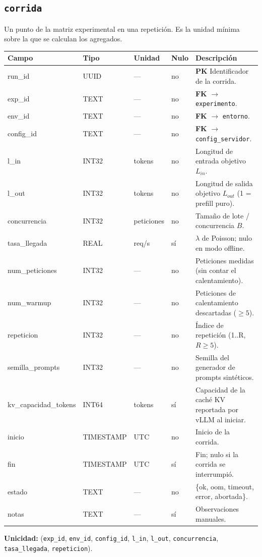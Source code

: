 \documentclass[11pt,a4paper]{article}
\makeatletter
\newcommand{\PK}{\textcolor{pkc}{\textbf{PK}}}
\newcommand{\FK}{\textcolor{fkc}{\textbf{FK}}}
\newcommand{\campo}[1]{\texttt{#1}}
\newenvironment{diccionario}{%
  \small
  \begin{longtable}{@{}>{\raggedright\ttfamily}p{3.4cm}>{\raggedright}p{2.2cm}>{\raggedright}p{1.6cm}p{0.9cm}>{\raggedright\arraybackslash}p{5.8cm}@{}}
  \toprule
  \normalfont\textbf{Campo} & \textbf{Tipo} & \textbf{Unidad} & \textbf{Nulo} & \textbf{Descripción}\\
  \midrule\endhead
  \bottomrule\endfoot
}{\end{longtable}}
\makeatother
\begin{document}
\subsection{\texttt{corrida}}
Un punto de la matriz experimental en una repetición. Es la unidad mínima sobre la que se calculan los agregados.
\begin{diccionario}
run_id & UUID & — & no & \PK{} Identificador de la corrida.\\
exp_id & TEXT & — & no & \FK{} $\rightarrow$ \texttt{experimento}.\\
env_id & TEXT & — & no & \FK{} $\rightarrow$ \texttt{entorno}.\\
config_id & TEXT & — & no & \FK{} $\rightarrow$ \texttt{config_servidor}.\\
l_in & INT32 & tokens & no & Longitud de entrada objetivo $L_{in}$.\\
l_out & INT32 & tokens & no & Longitud de salida objetivo $L_{out}$ (1 = prefill puro).\\
concurrencia & INT32 & peticiones & no & Tamaño de lote / concurrencia $B$.\\
tasa_llegada & REAL & req/s & sí & $\lambda$ de Poisson; nulo en modo offline.\\
num_peticiones & INT32 & — & no & Peticiones medidas (sin contar el calentamiento).\\
num_warmup & INT32 & — & no & Peticiones de calentamiento descartadas ($\geq 5$).\\
repeticion & INT32 & — & no & Índice de repetición (1..R, $R \geq 5$).\\
semilla_prompts & INT32 & — & no & Semilla del generador de prompts sintéticos.\\
kv_capacidad_tokens & INT64 & tokens & sí & Capacidad de la caché KV reportada por vLLM al iniciar.\\
inicio & TIMESTAMP & UTC & no & Inicio de la corrida.\\
fin & TIMESTAMP & UTC & sí & Fin; nulo si la corrida se interrumpió.\\
estado & TEXT & — & no & \{ok, oom, timeout, error, abortada\}.\\
notas & TEXT & — & sí & Observaciones manuales.\\
\end{diccionario}
\textbf{Unicidad:} (\campo{exp_id}, \campo{env_id}, \campo{config_id}, \campo{l_in}, \campo{l_out}, \campo{concurrencia}, \campo{tasa_llegada}, \campo{repeticion}).
\end{document}
